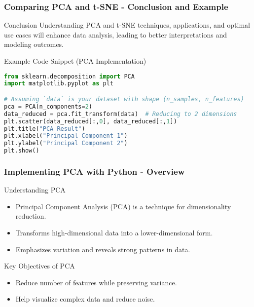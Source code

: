 \documentclass[aspectratio=169]{beamer}
\begin{document}
\begin{frame}[fragile]
    \frametitle{Comparing PCA and t-SNE - Conclusion and Example}
    \begin{block}{Conclusion}
        Understanding PCA and t-SNE techniques, applications, and optimal use cases will enhance data analysis, leading to better interpretations and modeling outcomes.
    \end{block}
    \begin{block}{Example Code Snippet (PCA Implementation)}
    \begin{lstlisting}[language=Python]
from sklearn.decomposition import PCA
import matplotlib.pyplot as plt

# Assuming `data` is your dataset with shape (n_samples, n_features)
pca = PCA(n_components=2)
data_reduced = pca.fit_transform(data)  # Reducing to 2 dimensions
plt.scatter(data_reduced[:,0], data_reduced[:,1])
plt.title("PCA Result")
plt.xlabel("Principal Component 1")
plt.ylabel("Principal Component 2")
plt.show()
    \end{lstlisting}
    \end{block}
\end{frame}

\begin{frame}[fragile]
    \frametitle{Implementing PCA with Python - Overview}
    \begin{block}{Understanding PCA}
        \begin{itemize}
            \item Principal Component Analysis (PCA) is a technique for dimensionality reduction.
            \item Transforms high-dimensional data into a lower-dimensional form.
            \item Emphasizes variation and reveals strong patterns in data.
        \end{itemize}
    \end{block}
    
    \begin{block}{Key Objectives of PCA}
        \begin{itemize}
            \item Reduce number of features while preserving variance.
            \item Help visualize complex data and reduce noise.
        \end{itemize}
    \end{block}
\end{frame}
\end{document}

